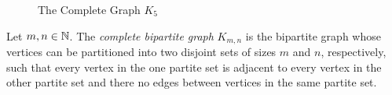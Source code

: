 \begin{figure}[H]
    \begin{center}
    \end{center}
    \caption{The Complete Graph $K_{5}$}
    \label{fig:K5}
    \end{figure}
  
\begin{definition}
    Let $m,n\in \mathbb{N}$. The \textit{complete bipartite graph} $K_{m,n}$ is the bipartite graph whose vertices can be partitioned into two disjoint sets of sizes $m$ and $n$, respectively, such that every vertex in the one partite set is adjacent to every vertex in the other partite set and there no edges between vertices in the same partite set.
\end{definition}

